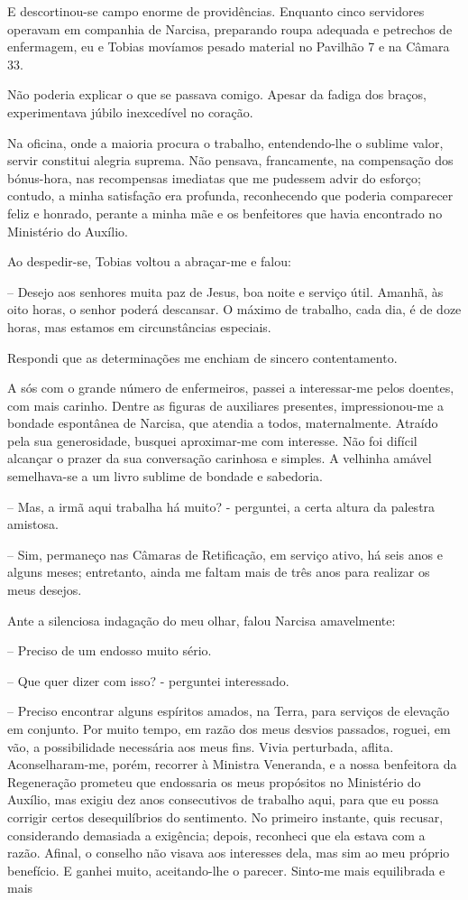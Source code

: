 \documentclass[portuguese,12pt,a4paper]{scrbook}
\begin{document}
	E descortinou-se campo enorme de providências. Enquanto cinco servidores operavam em companhia de Narcisa, preparando roupa adequada e petrechos de enfermagem, eu e Tobias movíamos pesado material no Pavilhão 7 e na Câmara 33.
	
	Não poderia explicar o que se passava comigo. Apesar da fadiga dos braços, experimentava júbilo inexcedível no coração.
	
	Na oficina, onde a maioria procura o trabalho, entendendo-lhe o sublime valor, servir constitui alegria suprema. Não pensava, francamente, na compensação dos bónus-hora, nas recompensas imediatas que me pudessem advir do esforço; contudo, a minha satisfação era profunda, reconhecendo que poderia comparecer feliz e honrado, perante a minha mãe e os benfeitores que havia encontrado no Ministério do Auxílio.
	
	Ao despedir-se, Tobias voltou a abraçar-me e falou:
	
	– Desejo aos senhores muita paz de Jesus, boa noite e serviço útil. Amanhã, às oito horas, o senhor poderá descansar. O máximo de trabalho, cada dia, é de doze horas, mas estamos em circunstâncias especiais.
	
	
	Respondi que as determinações me enchiam de sincero contentamento.
	
	A sós com o grande número de enfermeiros, passei a interessar-me pelos doentes, com mais carinho. Dentre as figuras de auxiliares presentes, impressionou-me a bondade espontânea de Narcisa, que atendia a todos, maternalmente. Atraído pela sua generosidade, busquei aproximar-me com interesse. Não foi difícil alcançar o prazer da sua conversação carinhosa e simples. A velhinha amável semelhava-se a um livro sublime de bondade e sabedoria.
	
	– Mas, a irmã aqui trabalha há muito? - perguntei, a certa altura da palestra amistosa.
	
	– Sim, permaneço nas Câmaras de Retificação, em serviço ativo, há seis anos e alguns meses; entretanto, ainda me faltam mais de três anos para realizar os meus desejos.
	
	Ante a silenciosa indagação do meu olhar, falou Narcisa amavelmente:
	
	– Preciso de um endosso muito sério.
	
	– Que quer dizer com isso? - perguntei interessado.
	
	– Preciso encontrar alguns espíritos amados, na Terra, para serviços de elevação em conjunto. Por muito tempo, em razão dos meus desvios passados, roguei, em vão, a possibilidade necessária aos meus fins. Vivia perturbada, aflita. Aconselharam-me, porém, recorrer à Ministra Veneranda, e a nossa benfeitora da Regeneração prometeu que endossaria os meus propósitos no Ministério do Auxílio, mas exigiu dez anos consecutivos de trabalho aqui, para que eu possa corrigir certos desequilíbrios do sentimento. No primeiro instante, quis recusar, considerando demasiada a exigência; depois, reconheci que ela estava com a razão. Afinal, o conselho não visava aos interesses dela, mas sim ao meu próprio benefício. E ganhei muito, aceitando-lhe o parecer. Sinto-me mais equilibrada e mais
	
\end{document}
